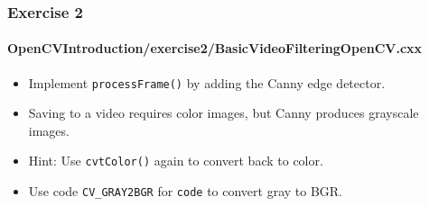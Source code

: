 \begin{frame}
\frametitle{Exercise 2}
\framesubtitle{OpenCVIntroduction/exercise2/BasicVideoFilteringOpenCV.cxx}
\begin{center}
\begin{itemize}
\item Implement {\tt\small processFrame()} by adding the Canny edge detector.
\pause
\item Saving to a video requires color images, but Canny produces grayscale images.
\item Hint: Use {\tt\small cvtColor()} again to convert back to color.
\item Use code {\tt\small CV\_GRAY2BGR} for {\tt\small code} to convert gray to BGR.
\end{itemize}
\end{center}
\end{frame}
